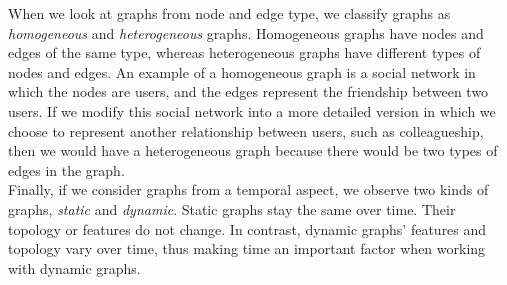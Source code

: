 When we look at graphs from node and edge type, we classify graphs as \emph{homogeneous} and \emph{heterogeneous} graphs. Homogeneous graphs have nodes and edges of the same type, whereas heterogeneous graphs have different types of nodes and edges. An example of a homogeneous graph is a social network in which the nodes are users, and the edges represent the friendship between two users. If we modify this social network into a more detailed version in which we choose to represent another relationship between users, such as colleagueship, then we would have a heterogeneous graph because there would be two types of edges in the graph.\\
Finally, if we consider graphs from a temporal aspect, we observe two kinds of graphs, \emph{static} and \emph{dynamic}. Static graphs stay the same over time. Their topology or features do not change. In contrast, dynamic graphs' features and topology vary  over time, thus making time an important factor when working with dynamic graphs.

